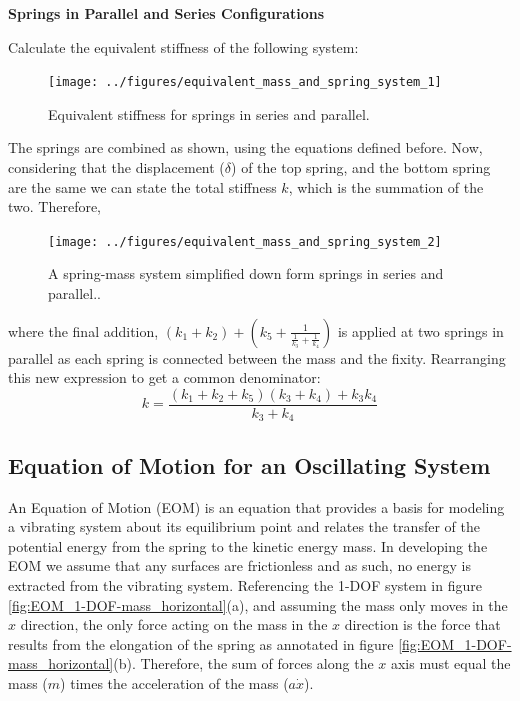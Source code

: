 \documentclass[12pt,letter]{article}
\begin{document}
			\begin{example}

			\textbf{Springs in Parallel and Series Configurations}

			\noindent Calculate the equivalent stiffness of the following system:
				\begin{figure}[H]
					\centering
					\texttt{[image: ../figures/equivalent\_mass\_and\_spring\_system\_1]}
					\caption{Equivalent stiffness for springs in series and parallel.}
				\end{figure}	
				The springs are combined as shown, using the equations defined before.  Now, considering that the displacement ($\delta$) of the top spring, and the bottom spring are the same we can state the total stiffness $k$, which is the summation of the two. Therefore,    
				\begin{figure}[H]
					\centering
					\texttt{[image: ../figures/equivalent\_mass\_and\_spring\_system\_2]}
					\caption{A spring-mass system simplified down form springs in series and parallel..}
				\end{figure}	
				\noindent where the final addition, $(k_1+k_2) + (k_5+\frac{1}{\frac{1}{k_3}+\frac{1}{k_4}})$ is applied at two springs in parallel as each spring is connected between the mass and the fixity. Rearranging this new expression to get a common denominator:
				\begin{equation}
					k= \frac{(k_1+k_2+k_5)(k_3+k_4)+k_3k_4}{k_3+k_4}  
				\end{equation}				
			\end{example}	

					
	\subsection{Equation of Motion for an Oscillating System}			
			
        An Equation of Motion (EOM) is an equation that provides a basis for modeling a vibrating system about its equilibrium point and relates the transfer of the potential energy from the spring to the kinetic energy mass. In developing the EOM we assume that any surfaces are frictionless and as such, no energy is extracted from the vibrating system. Referencing the 1-DOF system in figure \ref{fig:EOM_1-DOF-mass_horizontal}(a), and assuming the mass only moves in the $x$ direction, the only force acting on the mass in the $x$ direction is the force that results from the elongation of the spring as annotated in figure \ref{fig:EOM_1-DOF-mass_horizontal}(b). Therefore, the sum of forces along the $x$ axis must equal the mass ($m$) times the acceleration of the mass ($a\dot{x}$). 
\end{document}
